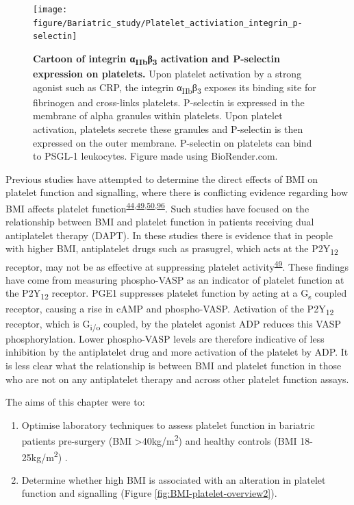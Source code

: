 \documentclass[11pt,twoside]{bristolthesis}
\providecommand{\tightlist}{%
  \setlength{\itemsep}{0pt}\setlength{\parskip}{0pt}}
\begin{document}
\begin{figure}
\texttt{[image: figure/Bariatric\_study/Platelet\_activiation\_integrin\_p-selectin]} \caption[Cartoon of integrin α\textsubscript{IIb}β\textsubscript{3} and P-selectin on platelets.]{\textbf{Cartoon of integrin α\textsubscript{IIb}β\textsubscript{3} activation and P-selectin expression on platelets.} Upon platelet activation by a strong agonist such as CRP, the integrin α\textsubscript{IIb}β\textsubscript{3} exposes its binding site for fibrinogen and cross-links platelets. P-selectin is expressed in the membrane of alpha granules within platelets. Upon platelet activation, platelets secrete these granules and P-selectin is then expressed on the outer membrane. P-selectin on platelets can bind to PSGL-1 leukocytes. Figure made using BioRender.com.}\label{fig:platelet-activation-2}
\end{figure}
Previous studies have attempted to determine the direct effects of BMI on platelet function and signalling, where there is conflicting evidence regarding how BMI affects platelet function\textsuperscript{\protect\hyperlink{ref-Nardin2015}{44},\protect\hyperlink{ref-Deharo2014}{49},\protect\hyperlink{ref-Sibbing2007}{50},\protect\hyperlink{ref-Barrachina2019}{96}}. Such studies have focused on the relationship between BMI and platelet function in patients receiving dual antiplatelet therapy (DAPT). In these studies there is evidence that in people with higher BMI, antiplatelet drugs such as prasugrel, which acts at the P2Y\textsubscript{12} receptor, may not be as effective at suppressing platelet activity\textsuperscript{\protect\hyperlink{ref-Deharo2014}{49}}. These findings have come from measuring phospho-VASP as an indicator of platelet function at the P2Y\textsubscript{12} receptor. PGE1 suppresses platelet function by acting at a G\textsubscript{s} coupled receptor, causing a rise in cAMP and phospho-VASP. Activation of the P2Y\textsubscript{12} receptor, which is G\textsubscript{i/o} coupled, by the platelet agonist ADP reduces this VASP phosphorylation. Lower phospho-VASP levels are therefore indicative of less inhibition by the antiplatelet drug and more activation of the platelet by ADP. It is less clear what the relationship is between BMI and platelet function in those who are not on any antiplatelet therapy and across other platelet function assays.

The aims of this chapter were to:
\begin{enumerate}
\def\labelenumi{\arabic{enumi})}
\tightlist
\item
  Optimise laboratory techniques to assess platelet function in bariatric patients pre-surgery (BMI \textgreater40kg/m\textsuperscript{2}) and healthy controls (BMI 18-25kg/m\textsuperscript{2}) .
\item
  Determine whether high BMI is associated with an alteration in platelet function and signalling (Figure \ref{fig:BMI-platelet-overview2}).
\end{enumerate}
\end{document}
